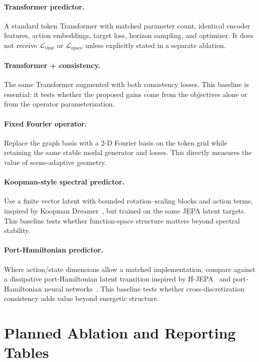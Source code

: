 \documentclass{article}
\theoremstyle{plain}
\theoremstyle{definition}
\theoremstyle{remark}
\newcommand{\Loss}{\mathcal{L}}
\begin{document}
\paragraph{Transformer predictor.}
A standard token Transformer with matched parameter count, identical encoder features, action embeddings, target loss, horizon sampling, and optimizer. It does not receive $\Loss_{\mathrm{time}}$ or $\Loss_{\mathrm{space}}$ unless explicitly stated in a separate ablation.

\paragraph{Transformer + consistency.}
The same Transformer augmented with both consistency losses. This baseline is essential: it tests whether the proposed gains come from the objectives alone or from the operator parameterization.

\paragraph{Fixed Fourier operator.}
Replace the graph basis with a 2-D Fourier basis on the token grid while retaining the same stable modal generator and losses. This directly measures the value of scene-adaptive geometry.

\paragraph{Koopman-style spectral predictor.}
Use a finite vector latent with bounded rotation--scaling blocks and action terms, inspired by Koopman Dreamer~\citep{li2026koopman}, but trained on the same JEPA latent targets. This baseline tests whether function-space structure matters beyond spectral stability.

\paragraph{Port-Hamiltonian predictor.}
Where action/state dimensions allow a matched implementation, compare against a dissipative port-Hamiltonian latent transition inspired by H-JEPA~\citep{zoabi2026hjjepa} and port-Hamiltonian neural networks~\citep{desai2021port}. This baseline tests whether cross-discretization consistency adds value beyond energetic structure.

\section{Planned Ablation and Reporting Tables}
\label{app:tables}
\end{document}
